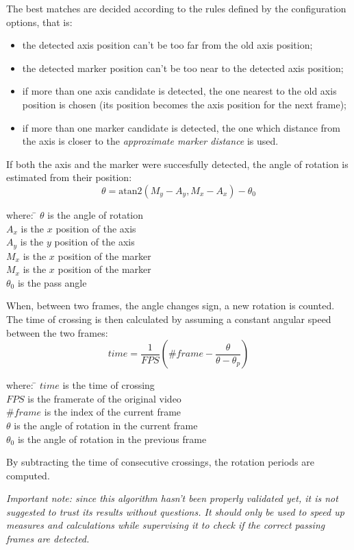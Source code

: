 \beforelist* The best matches are decided according to the rules defined by the configuration options, that is:
\begin{itemize}
  \item the detected axis position can't be too far from the old axis position;
  \item the detected marker position can't be too near to the detected axis
    position;
  \item if more than one axis candidate is detected, the one nearest to the old
    axis position is chosen (its position becomes the axis position for the next
    frame);
  \item if more than one marker candidate is detected, the one which distance
    from the axis is closer to the \emph{approximate marker distance} is used.
\end{itemize}
\afterlist*
If both the axis and the marker were succesfully detected, the angle of rotation
is estimated from their position:
\[
  \theta = \mathrm{atan2}\left( M_y-A_y, M_x-A_x \right) - \theta_0
\]
\begin{tabbing}
where:  \= $\theta$ is the angle of rotation \\
        \> $A_x$ is the $x$ position of the axis \\
        \> $A_y$ is the $y$ position of the axis \\
        \> $M_x$ is the $x$ position of the marker \\
        \> $M_x$ is the $x$ position of the marker \\
        \> $\theta_0$ is the pass angle
\end{tabbing}

When, between two frames, the angle changes sign, a new rotation is counted.
The time of crossing is then calculated by assuming a constant angular speed
between the two frames:
\[
  time = \frac{1}{FPS}\left( \#frame - \frac{\theta}{\theta - \theta_p} \right)
\]
\begin{tabbing}
where:  \= $time$ is the time of crossing \\
        \> $FPS$ is the framerate of the original video \\
        \> $\#frame$ is the index of the current frame \\
        \> $\theta$ is the angle of rotation in the current frame \\
        \> $\theta_0$ is the angle of rotation in the previous frame 
\end{tabbing}
By subtracting the time of consecutive crossings, the rotation periods are
computed.

\textit{Important note: since this algorithm hasn't been properly validated yet,
it is not suggested to trust its results without questions. It should only be
used to speed up measures and calculations while supervising it to check if the
correct passing frames are detected.}
